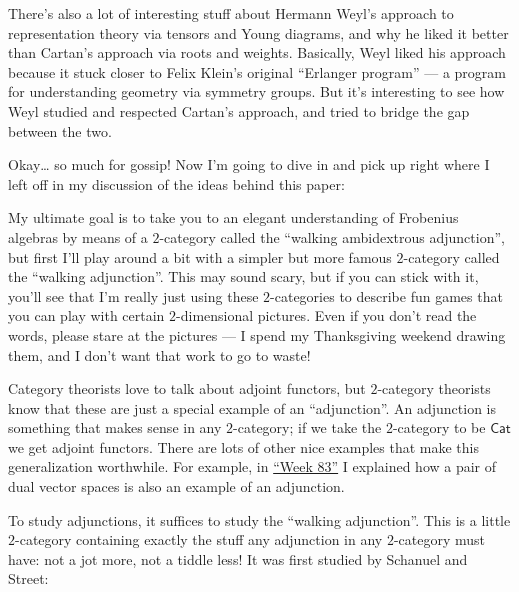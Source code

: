 \documentclass{article}
\def\tightlist{}
\renewcommand{\texttt}[1]{%
  \begingroup
  \ttfamily
  \begingroup\lccode`~=`/\lowercase{\endgroup\def~}{/\discretionary{}{}{}}%
  \begingroup\lccode`~=`[\lowercase{\endgroup\def~}{[\discretionary{}{}{}}%
  \begingroup\lccode`~=`.\lowercase{\endgroup\def~}{.\discretionary{}{}{}}%
  \catcode`/=\active\catcode`[=\active\catcode`.=\active
  \scantokens{#1\noexpand}%
  \endgroup
}
\begin{document}
There's also a lot of interesting stuff about Hermann Weyl's approach to
representation theory via tensors and Young diagrams, and why he liked
it better than Cartan's approach via roots and weights. Basically, Weyl
liked his approach because it stuck closer to Felix Klein's original
``Erlanger program'' --- a program for understanding geometry via
symmetry groups. But it's interesting to see how Weyl studied and
respected Cartan's approach, and tried to bridge the gap between the
two.

Okay\ldots{} so much for gossip! Now I'm going to dive in and pick up
right where I left off in my discussion of the ideas behind this paper:


My ultimate goal is to take you to an elegant understanding of Frobenius
algebras by means of a \(2\)-category called the ``walking ambidextrous
adjunction'', but first I'll play around a bit with a simpler but more
famous \(2\)-category called the ``walking adjunction''. This may sound
scary, but if you can stick with it, you'll see that I'm really just
using these \(2\)-categories to describe fun games that you can play
with certain \(2\)-dimensional pictures. Even if you don't read the
words, please stare at the pictures --- I spend my Thanksgiving weekend
drawing them, and I don't want that work to go to waste!

Category theorists love to talk about adjoint functors, but
\(2\)-category theorists know that these are just a special example of
an ``adjunction''. An adjunction is something that makes sense in any
\(2\)-category; if we take the \(2\)-category to be \(\mathsf{Cat}\) we
get adjoint functors. There are lots of other nice examples that make
this generalization worthwhile. For example, in
\protect\hyperlink{week83}{``Week 83''} I explained how a pair of dual
vector spaces is also an example of an adjunction.

To study adjunctions, it suffices to study the ``walking adjunction''.
This is a little \(2\)-category containing exactly the stuff any
adjunction in any \(2\)-category must have: not a jot more, not a tiddle
less! It was first studied by Schanuel and Street:
\end{document}
